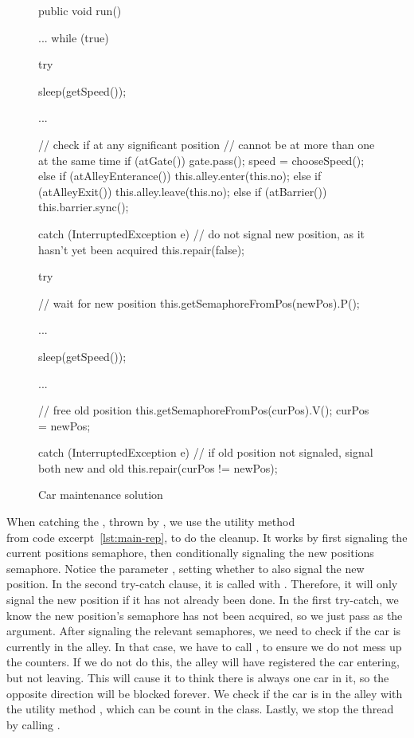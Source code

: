 \begin{figure}[H]
  \begin{java}
public void run() {
    ...
    while (true) {
        try {
            sleep(getSpeed());

            ...

            // check if at any significant position
            // cannot be at more than one at the same time
            if (atGate()) {
                gate.pass();
                speed = chooseSpeed();
            } else if (atAlleyEnterance()) {
                this.alley.enter(this.no);
            } else if (atAlleyExit()) {
                this.alley.leave(this.no);
            } else if (atBarrier()) {
                this.barrier.sync();
            }

        } catch (InterruptedException e) {
            // do not signal new position, as it hasn't yet been acquired
            this.repair(false);
        }

        try {
            // wait for new position
            this.getSemaphoreFromPos(newPos).P();

            ...

            sleep(getSpeed());

            ...

            // free old position
            this.getSemaphoreFromPos(curPos).V();
            curPos = newPos;

        } catch (InterruptedException e) {
            // if old position not signaled, signal both new and old
            this.repair(curPos != newPos);
        }
    }
}
  \end{java}
  \caption{Car maintenance solution}
\label{lst:main-run}
\end{figure}

When catching the , thrown by
, we use the utility method \\
 from code excerpt~\ref{lst:main-rep}, to do
the cleanup. It works by first signaling the current positions
semaphore, then conditionally signaling the new positions
semaphore. Notice the parameter , setting whether to
also signal the new position. In the second try-catch clause, it is
called with . Therefore, it will only
signal the new position if it has not already been done. In the first
try-catch, we know the new position's semaphore has not been acquired,
so we just pass  as the argument. After signaling the
relevant semaphores, we need to check if the car is currently in the
alley. In that case, we have to call , to ensure we do not mess up the counters. If we do not do
this, the alley will have registered the car entering, but not
leaving. This will cause it to think there is always one car in it, so
the opposite direction will be blocked forever. We check if the car is
in the alley with the utility method , which can be
count in the  class. Lastly, we stop the thread by calling .

